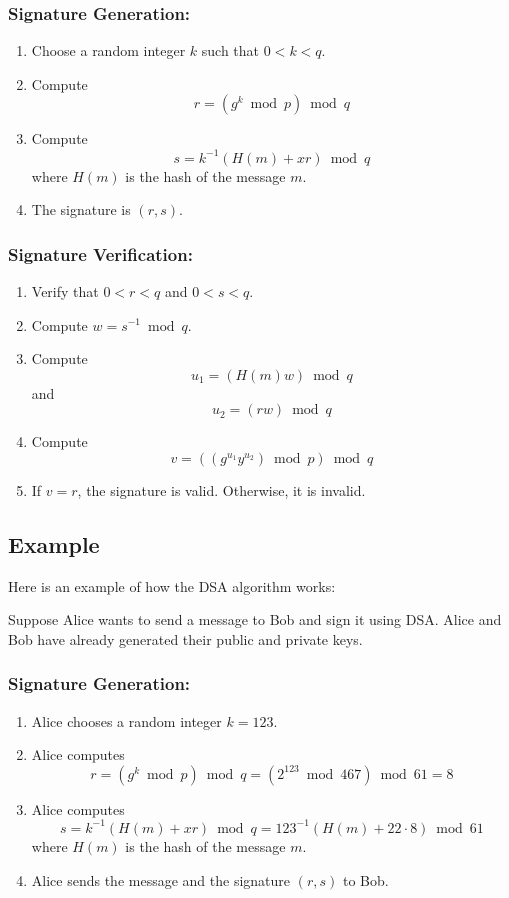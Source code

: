 \documentclass[11pt]{article}
\begin{document}
\subsubsection{Signature Generation:}

\begin{enumerate}
    \item Choose a random integer $k$ such that $0 < k < q$.
    \item Compute $$r = (g^k \bmod p) \bmod q$$
    \item Compute $$s = k^{-1} (H(m) + xr) \bmod q$$ where $H(m)$ is the hash of the message $m$.
    \item The signature is $(r, s)$.
\end{enumerate}

\subsubsection{Signature Verification:}

\begin{enumerate}
    \item Verify that $0 < r < q$ and $0 < s < q$.
    \item Compute $w = s^{-1} \bmod q$.
    \item Compute $$u_1 = (H(m)w) \bmod q$$ and $$u_2 = (rw) \bmod q$$
    \item Compute $$v = ((g^{u_1} y^{u_2}) \bmod p) \bmod q$$
    \item If $v = r$, the signature is valid. Otherwise, it is invalid.
\end{enumerate}

\subsection{Example}

Here is an example of how the DSA algorithm works:

Suppose Alice wants to send a message to Bob and sign it using DSA. Alice and Bob have already generated their public and private keys.

\subsubsection{Signature Generation:}

\begin{enumerate}
    \item Alice chooses a random integer $k = 123$.
    \item Alice computes $$r = (g^k \bmod p) \bmod q = (2^{123} \bmod 467) \bmod 61 = 8$$
    \item Alice computes $$s = k^{-1} (H(m) + xr) \bmod q = 123^{-1} (H(m) + 22 \cdot 8) \bmod 61$$ where $H(m)$ is the hash of the message $m$.
    \item Alice sends the message and the signature $(r, s)$ to Bob.
\end{enumerate}
\end{document}
